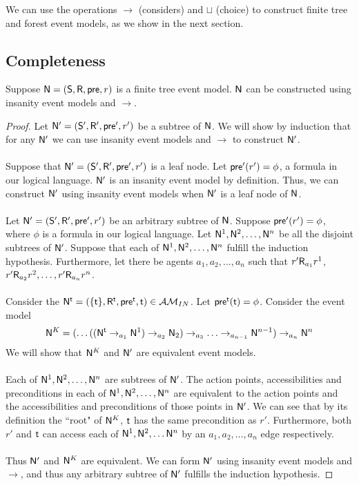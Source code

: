 We can use the operations $\to$ (considers) and $\sqcup$ (choice) to construct finite tree and
forest event models, as we show in the next section.

\subsection{Completeness}

\begin{lemma} \label{finTreeConstruct}
Suppose $\mathrm{\mathsf{N}} = (\mathrm{\mathsf{S}}, \mathrm{\mathsf{R}}, \mathrm{\mathsf{pre}}, r)$ is a finite tree event model.
$\mathrm{\mathsf{N}}$ can be constructed using insanity event models and $\to$.
\end{lemma}
\begin{proof}
Let $\mathrm{\mathsf{N}}' = (\mathrm{\mathsf{S}}', \mathrm{\mathsf{R}}', \mathrm{\mathsf{pre}}', r')$ be a subtree of $\mathrm{\mathsf{N}}$.
We will show by induction that for any $\mathrm{\mathsf{N}}'$ we can use insanity event models and $\to$ to
construct $\mathrm{\mathsf{N}}'$.\\
\\
Suppose that $\mathrm{\mathsf{N}}' = (\mathrm{\mathsf{S}}', \mathrm{\mathsf{R}}', \mathrm{\mathsf{pre}}', r')$ is a leaf node.
Let $\mathrm{\mathsf{pre}}'(r') = \phi$, a formula in our logical language.
$\mathrm{\mathsf{N}}'$ is an insanity event model by definition.
Thus, we can construct $\mathrm{\mathsf{N}}'$ using insanity event models when $\mathrm{\mathsf{N}}'$ is a leaf node of $\mathrm{\mathsf{N}}$.\\
\\
Let $\mathrm{\mathsf{N}}' = (\mathrm{\mathsf{S}}', \mathrm{\mathsf{R}}', \mathrm{\mathsf{pre}}', r')$ be an arbitrary subtree of $\mathrm{\mathsf{N}}$.
Suppose $\mathrm{\mathsf{pre}}'(r') = \phi$, where $\phi$ is a formula in our logical language.
Let $\mathrm{\mathsf{N}}^1, \mathrm{\mathsf{N}}^2, \ldots, \mathrm{\mathsf{N}}^n$ be all the disjoint subtrees of $\mathrm{\mathsf{N}}'$.
Suppose that each of $\mathrm{\mathsf{N}}^1, \mathrm{\mathsf{N}}^2, \ldots, \mathrm{\mathsf{N}}^n$ fulfill the induction hypothesis.
Furthermore, let there be agents $a_1, a_2, \ldots, a_n$ such that $r' \mathrm{\mathsf{R}}_{a_1} r^1$, $r' \mathrm{\mathsf{R}}_{a_2} r^2,
	\ldots, r' \mathrm{\mathsf{R}}_{a_n} r^n$.\\
\\
Consider the $\mathrm{\mathsf{N}}^\mathrm{\mathsf{t}} = (\{ \mathrm{\mathsf{t}} \}, \mathrm{\mathsf{R}}^\mathrm{\mathsf{t}}, \mathrm{\mathsf{pre}}^\mathrm{\mathsf{t}}, \mathrm{\mathsf{t}}) \in \mathcal{AM}_{IN}$.
Let $\mathrm{\mathsf{pre}}^\mathrm{\mathsf{t}}(\mathrm{\mathsf{t}}) = \phi$.
Consider the event model 
\[
\mathrm{\mathsf{N}}^K = (\ldots((\mathrm{\mathsf{N}}^\mathrm{\mathsf{t}} \to_{a_1} \mathrm{\mathsf{N}} ^ 1) \to_{a_2} \mathrm{\mathsf{N}}_2) \to_{a_3} \ldots
\to_{a_{n-1}} \mathrm{\mathsf{N}}^{n-1} ) \to_{a_n} \mathrm{\mathsf{N}} ^ n
\]
We will show that $\mathrm{\mathsf{N}}^K$ and $\mathrm{\mathsf{N}}'$ are equivalent event models.\\
\\
Each of $\mathrm{\mathsf{N}}^1, \mathrm{\mathsf{N}}^2, \ldots, \mathrm{\mathsf{N}}^n$ are subtrees of $\mathrm{\mathsf{N}}'$.
The action points, accessibilities and preconditions in each of $\mathrm{\mathsf{N}}^1, \mathrm{\mathsf{N}}^2, \ldots, \mathrm{\mathsf{N}}^n$ are
equivalent to the action points and the accessibilities and preconditions of those points in $\mathrm{\mathsf{N}}'$.
We can see that by its definition the ``root" of $\mathrm{\mathsf{N}}^K$, $\mathrm{\mathsf{t}}$ has the same precondition as $r'$.
Furthermore, both $r'$ and $\mathrm{\mathsf{t}}$ can access each of $\mathrm{\mathsf{N}}^1, \mathrm{\mathsf{N}}^2, \ldots \mathrm{\mathsf{N}}^n$ by an $a_1, a_2, \ldots, a_n$ edge
respectively.\\
\\
Thus $\mathrm{\mathsf{N}}'$ and $\mathrm{\mathsf{N}}^K$ are equivalent.
We can form $\mathrm{\mathsf{N}}'$ using insanity event models and $\to$, and thus any arbitrary subtree of $\mathrm{\mathsf{N}}'$
fulfills the induction hypothesis.
\end{proof}

